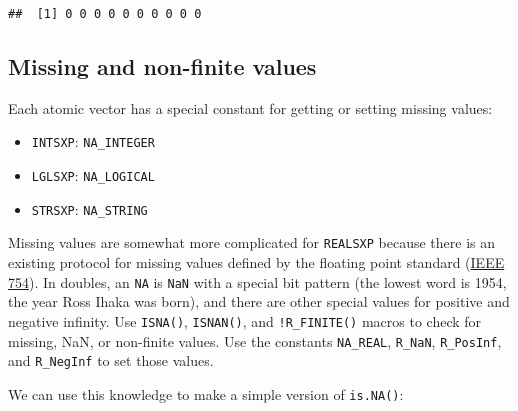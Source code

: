 \begin{verbatim}
##  [1] 0 0 0 0 0 0 0 0 0 0
\end{verbatim}

\hypertarget{missing-and-non-finite-values}{%
\subsection{Missing and non-finite
values}\label{missing-and-non-finite-values}}

Each atomic vector has a special constant for getting or setting missing
values:

\begin{itemize}
\tightlist
\item
  \texttt{INTSXP}: \texttt{NA\_INTEGER}
\item
  \texttt{LGLSXP}: \texttt{NA\_LOGICAL}
\item
  \texttt{STRSXP}: \texttt{NA\_STRING}
\end{itemize}

Missing values are somewhat more complicated for \texttt{REALSXP}
because there is an existing protocol for missing values defined by the
floating point standard
(\href{http://en.wikipedia.org/wiki/IEEE_floating_point}{IEEE 754}). In
doubles, an \texttt{NA} is \texttt{NaN} with a special bit pattern (the
lowest word is 1954, the year Ross Ihaka was born), and there are other
special values for positive and negative infinity. Use \texttt{ISNA()},
\texttt{ISNAN()}, and \texttt{!R\_FINITE()} macros to check for missing,
NaN, or non-finite values. Use the constants \texttt{NA\_REAL},
\texttt{R\_NaN}, \texttt{R\_PosInf}, and \texttt{R\_NegInf} to set those
values. 

We can use this knowledge to make a simple version of \texttt{is.NA()}:

